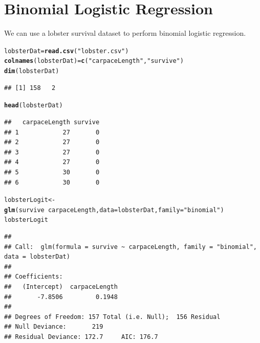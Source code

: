 \documentclass{article}\usepackage[]{graphicx}\usepackage[]{color}
\makeatletter
\newcommand{\hlstr}[1]{\textcolor[rgb]{0.192,0.494,0.8}{#1}}%
\newcommand{\hlopt}[1]{\textcolor[rgb]{0,0,0}{#1}}%
\newcommand{\hlstd}[1]{\textcolor[rgb]{0.345,0.345,0.345}{#1}}%
\newcommand{\hlkwb}[1]{\textcolor[rgb]{0.69,0.353,0.396}{#1}}%
\newcommand{\hlkwc}[1]{\textcolor[rgb]{0.333,0.667,0.333}{#1}}%
\newcommand{\hlkwd}[1]{\textcolor[rgb]{0.737,0.353,0.396}{\textbf{#1}}}%
\newenvironment{kframe}{%
 \def\at@end@of@kframe{}%
 \ifinner\ifhmode%
  \def\at@end@of@kframe{\end{minipage}}%
  \begin{minipage}{\columnwidth}%
 \fi\fi%
 \def\FrameCommand##1{\hskip\@totalleftmargin \hskip-\fboxsep
 \colorbox{shadecolor}{##1}\hskip-\fboxsep
     \hskip-\linewidth \hskip-\@totalleftmargin \hskip\columnwidth}%
 \MakeFramed {\advance\hsize-\width
   \@totalleftmargin\z@ \linewidth\hsize
   \@setminipage}}%
 {\par\unskip\endMakeFramed%
 \at@end@of@kframe}
\newenvironment{knitrout}{}{} %
\makeatother
\begin{document}
\newpage

\section{Binomial Logistic Regression}

We can use a lobster survival dataset to perform binomial logistic regression.

\begin{knitrout}
\color{fgcolor}\begin{kframe}
\begin{alltt}
\hlstd{lobsterDat} \hlkwb{=} \hlkwd{read.csv}\hlstd{(}\hlstr{"lobster.csv"}\hlstd{)}
\hlkwd{colnames}\hlstd{(lobsterDat)} \hlkwb{=} \hlkwd{c}\hlstd{(}\hlstr{"carpaceLength"}\hlstd{,}\hlstr{"survive"}\hlstd{)}
\hlkwd{dim}\hlstd{(lobsterDat)}
\end{alltt}
\begin{verbatim}
## [1] 158   2
\end{verbatim}
\begin{alltt}
\hlkwd{head}\hlstd{(lobsterDat)}
\end{alltt}
\begin{verbatim}
##   carpaceLength survive
## 1            27       0
## 2            27       0
## 3            27       0
## 4            27       0
## 5            30       0
## 6            30       0
\end{verbatim}
\end{kframe}
\end{knitrout}

\begin{knitrout}
\color{fgcolor}\begin{kframe}
\begin{alltt}
\hlstd{lobsterLogit} \hlkwb{<-} \hlkwd{glm}\hlstd{(survive} \hlopt{~} \hlstd{carpaceLength,} \hlkwc{data} \hlstd{= lobsterDat,} \hlkwc{family} \hlstd{=} \hlstr{"binomial"}\hlstd{)}
\hlstd{lobsterLogit}
\end{alltt}
\begin{verbatim}
## 
## Call:  glm(formula = survive ~ carpaceLength, family = "binomial", data = lobsterDat)
## 
## Coefficients:
##   (Intercept)  carpaceLength  
##       -7.8506         0.1948  
## 
## Degrees of Freedom: 157 Total (i.e. Null);  156 Residual
## Null Deviance:	    219 
## Residual Deviance: 172.7 	AIC: 176.7
\end{verbatim}
\end{kframe}
\end{knitrout}
\end{document}
